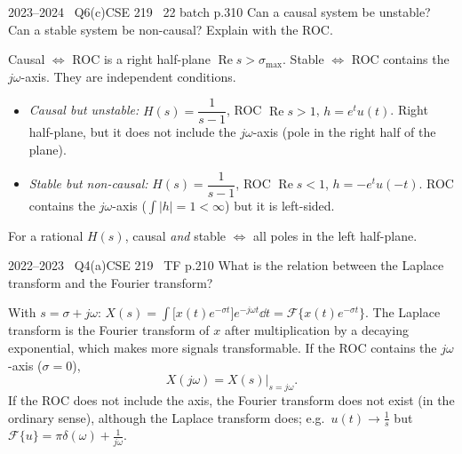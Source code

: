 \begin{qcard}{2023--2024 \textbullet\ Q6(c)}{CSE 219 \textbullet\ 22 batch p.3}{10}
Can a causal system be unstable? Can a stable system be non-causal? Explain with the ROC.
\end{qcard}
\begin{solution}
Causal $\Leftrightarrow$ ROC is a right half-plane $\operatorname{Re}s>\sigma_{\max}$. Stable $\Leftrightarrow$ ROC contains the $j\omega$-axis. They are independent conditions.
\begin{itemize}[leftmargin=1.4em,itemsep=2pt]
\item \emph{Causal but unstable:} $H(s)=\dfrac1{s-1}$, ROC $\operatorname{Re}s>1$, $h=e^{t}u(t)$. Right half-plane, but it does not include the $j\omega$-axis (pole in the right half of the plane).
\item \emph{Stable but non-causal:} $H(s)=\dfrac1{s-1}$, ROC $\operatorname{Re}s<1$, $h=-e^{t}u(-t)$. ROC contains the $j\omega$-axis ($\int|h|=1<\infty$) but it is left-sided.
\end{itemize}
For a rational $H(s)$, causal \emph{and} stable $\Leftrightarrow$ all poles in the left half-plane.
\end{solution}

\begin{qcard}{2022--2023 \textbullet\ Q4(a)}{CSE 219 \textbullet\ TF p.2}{10}
What is the relation between the Laplace transform and the Fourier transform?
\end{qcard}
\begin{solution}
With $s=\sigma+j\omega$: $X(s)=\displaystyle\int\big[x(t)e^{-\sigma t}\big]e^{-j\omega t}\dd t=\mathcal F\{x(t)e^{-\sigma t}\}$. The Laplace transform is the Fourier transform of $x$ after multiplication by a decaying exponential, which makes more signals transformable. If the ROC contains the $j\omega$-axis ($\sigma=0$),
\[X(j\omega)=X(s)\big|_{s=j\omega}.\]
If the ROC does not include the axis, the Fourier transform does not exist (in the ordinary sense), although the Laplace transform does; e.g.\ $u(t)\to\frac1s$ but $\mathcal F\{u\}=\pi\delta(\omega)+\frac1{j\omega}$.
\end{solution}

